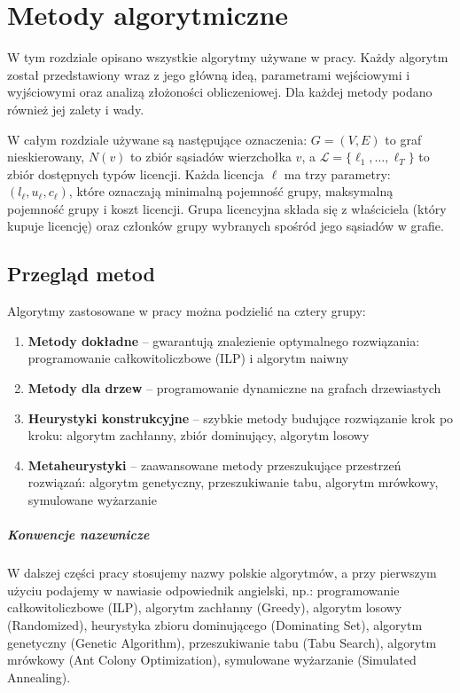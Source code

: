 \chapter{Metody algorytmiczne}\label{chap:algorithms}

W tym rozdziale opisano wszystkie algorytmy używane w pracy. Każdy algorytm został przedstawiony wraz z jego główną ideą, parametrami wejściowymi i wyjściowymi oraz analizą złożoności obliczeniowej. Dla każdej metody podano również jej zalety i wady.

W całym rozdziale używane są następujące oznaczenia: $G=(V,E)$ to graf nieskierowany, $N(v)$ to zbiór sąsiadów wierzchołka $v$, a $\mathcal{L}=\{\ell_1,\dots,\ell_T\}$ to zbiór dostępnych typów licencji. Każda licencja $\ell$ ma trzy parametry: $(l_\ell, u_\ell, c_\ell)$, które oznaczają minimalną pojemność grupy, maksymalną pojemność grupy i koszt licencji. Grupa licencyjna składa się z właściciela (który kupuje licencję) oraz członków grupy wybranych spośród jego sąsiadów w grafie.

\section{Przegląd metod}
Algorytmy zastosowane w pracy można podzielić na cztery grupy:
\begin{enumerate}
  \item \textbf{Metody dokładne} -- gwarantują znalezienie optymalnego rozwiązania: programowanie całkowitoliczbowe (ILP) i algorytm naiwny
  \item \textbf{Metody dla drzew} -- programowanie dynamiczne na grafach drzewiastych
  \item \textbf{Heurystyki konstrukcyjne} -- szybkie metody budujące rozwiązanie krok po kroku: algorytm zachłanny, zbiór dominujący, algorytm losowy
  \item \textbf{Metaheurystyki} -- zaawansowane metody przeszukujące przestrzeń rozwiązań: algorytm genetyczny, przeszukiwanie tabu, algorytm mrówkowy, symulowane wyżarzanie
\end{enumerate}

\paragraph{Konwencje nazewnicze} W dalszej części pracy stosujemy nazwy polskie algorytmów, a przy pierwszym użyciu podajemy w nawiasie odpowiednik angielski, np.: programowanie całkowitoliczbowe (ILP), algorytm zachłanny (Greedy), algorytm losowy (Randomized), heurystyka zbioru dominującego (Dominating Set), algorytm genetyczny (Genetic Algorithm), przeszukiwanie tabu (Tabu Search), algorytm mrówkowy (Ant Colony Optimization), symulowane wyżarzanie (Simulated Annealing).

